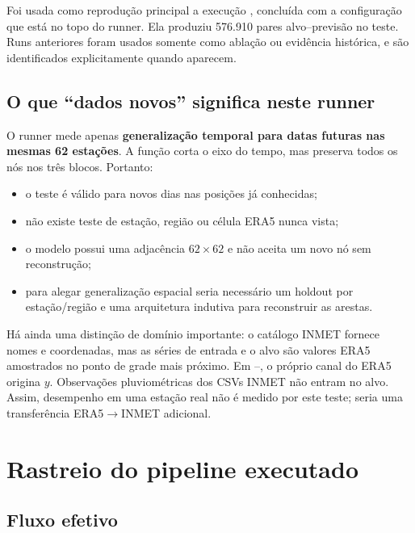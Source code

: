 \documentclass[11pt,a4paper]{article}
\newcommand{\code}[1]{\texttt{\detokenize{#1}}}
\begin{document}
Foi usada como reprodução principal a execução
, concluída com a configuração que está no topo do runner.
Ela produziu 576.910 pares alvo--previsão no teste. Runs anteriores foram usados somente como
ablação ou evidência histórica, e são identificados explicitamente quando aparecem.

\subsection{O que ``dados novos'' significa neste runner}

O runner mede apenas \textbf{generalização temporal para datas futuras nas mesmas 62
estações}. A função \code{chronological_split} corta o eixo do tempo, mas preserva todos os nós
nos três blocos. Portanto:

\begin{itemize}
  \item o teste é válido para novos dias nas posições já conhecidas;
  \item não existe teste de estação, região ou célula ERA5 nunca vista;
  \item o modelo possui uma adjacência $62\times 62$ e não aceita um novo nó sem reconstrução;
  \item para alegar generalização espacial seria necessário um holdout por estação/região e uma
  arquitetura indutiva para reconstruir as arestas.
\end{itemize}

Há ainda uma distinção de domínio importante: o catálogo INMET fornece nomes e coordenadas,
mas as séries de entrada e o alvo são valores ERA5 amostrados no ponto de grade mais próximo.
Em --, o próprio
canal \code{tp} do ERA5 origina $y$. Observações pluviométricas dos CSVs INMET não entram no
alvo. Assim, desempenho em uma estação real não é medido por este teste; seria uma transferência
ERA5$\rightarrow$INMET adicional.

\section{Rastreio do pipeline executado}

\subsection{Fluxo efetivo}
\end{document}
